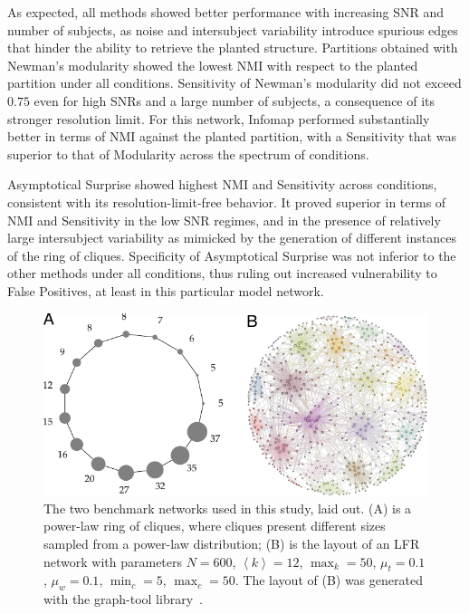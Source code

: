 As expected, all methods showed better performance with increasing SNR and number of subjects, as noise and intersubject variability introduce spurious edges that hinder the ability to retrieve the planted structure.
Partitions obtained with Newman's modularity showed the lowest NMI with respect to the planted partition under all conditions.
Sensitivity of Newman's modularity did not exceed $0.75$ even for high SNRs and a large number of subjects, a consequence of its stronger resolution limit.
For this network, Infomap performed substantially better in terms of NMI against the planted partition, with a Sensitivity that was superior to that of Modularity across the spectrum of conditions.

Asymptotical Surprise showed highest NMI and Sensitivity across conditions, consistent with its resolution-limit-free behavior. It proved superior in terms of NMI and Sensitivity in the low SNR regimes, and in the presence of relatively large intersubject variability as mimicked by the generation of different instances of the ring of cliques.
Specificity of Asymptotical Surprise was not inferior to the other methods under all conditions, thus ruling out increased vulnerability to False Positives, at least in this particular model network.
\begin{figure}[!htb]
\includegraphics[width=1\textwidth]{images/pacopaperfigure1.pdf}
\caption{The two benchmark networks used in this study, laid out. (A) is a power-law ring of cliques, where cliques present different sizes sampled from a power-law distribution;
(B) is the layout of an LFR network with parameters $N=600$, $\left< k \right>=12$, $\max_k=50$, $\mu_t=0.1$, $\mu_w=0.1$, $\min_c=5$, $\max_c=50$.
The layout of (B) was generated with the graph-tool library~\cite{peixoto_graph_tool_2014}.}
\label{fig:lfrringclique}
\end{figure}
